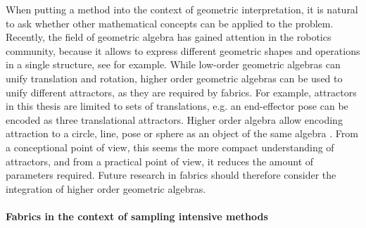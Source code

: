 When putting a method into the context of geometric
interpretation, it is natural to ask whether other
mathematical concepts can be applied to the problem.
Recently, the field of geometric algebra has gained 
attention in the robotics community, because it allows
to express different geometric shapes and operations in a
single structure, see \cite{low2023geometric} for example.
While low-order geometric algebras can unify translation and
rotation, higher order geometric algebras can be used to unify
different attractors, as they are required by \ac{fabrics}.
For example, attractors in this thesis are limited to
sets of translations, e.g. an end-effector pose can be
encoded as three translational attractors. Higher order
algebra allow encoding attraction to a circle, line, pose
or sphere as an object of the same algebra \cite{low2023geometric}.
From a conceptional point of view, this seems the more
compact understanding of attractors, and from a practical
point of view, it reduces the amount of parameters required.
Future research in \ac{fabrics} should therefore consider
the integration of higher order geometric algebras.

\paragraph{Fabrics in the context of sampling intensive methods}
\label{par:discussion_sampling_methods}

